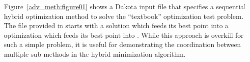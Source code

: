 
Figure~\ref{adv_meth:figure01} shows a Dakota input file that specifies
a sequential hybrid optimization method to solve the
``textbook'' optimization test problem.
The  file
provided in  starts with a
 solution which feeds its best point into a
 optimization which feeds its best
point into . While this approach is overkill for
such a simple problem, it is useful for demonstrating the coordination
between multiple sub-methods in the hybrid minimization algorithm.

